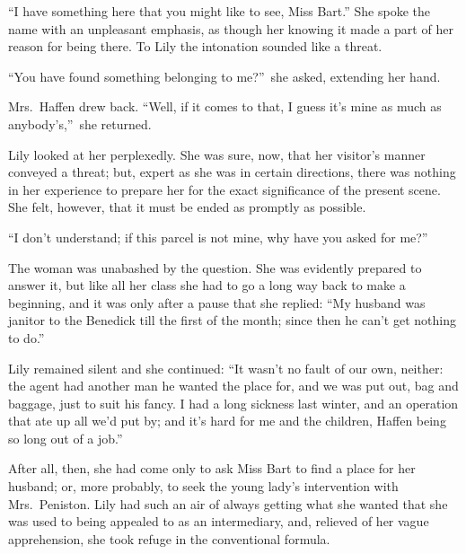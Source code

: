 \documentclass[12pt,a4paper]{book}
\begin{document}
``I have something here that you might like to see, Miss Bart.'' 
She spoke the name with an unpleasant emphasis, as though her
knowing it made a part of her reason for being there. To Lily the
intonation sounded like a threat.





``You have found something belonging to me?''\ she asked, extending
her hand.





Mrs.\ Haffen drew back. ``Well, if it comes to that, I guess it's
mine as much as anybody's,''\ she returned.





Lily looked at her perplexedly. She was sure, now, that her
visitor's manner conveyed a threat; but, expert as she was in
certain directions, there was nothing in her experience to
prepare her for the exact significance of the present scene. She
felt, however, that it must be ended as promptly as possible.





``I don't understand; if this parcel is not mine, why have you
asked for me?''





The woman was unabashed by the question. She was evidently
prepared to answer it, but like all her class she had to go a
long way back to make a beginning, and it was only after a pause
that she replied: ``My husband was janitor to the Benedick till
the first of the month; since then he can't get nothing to do.''





Lily remained silent and she continued: ``It wasn't no fault of
our own, neither: the agent had another man he wanted the place
for, and we was put out, bag and baggage, just to suit his fancy. 
I had a long sickness last winter, and an operation that ate up
all we'd put by; and it's hard for me and the children, Haffen
being so long out of a job.''





After all, then, she had come only to ask Miss Bart to find a
place for her husband; or, more probably, to seek the young
lady's intervention with Mrs.\ Peniston. Lily had such an air
of always getting what she wanted that she was used to being
appealed to as an intermediary, and, relieved of her vague
apprehension, she took refuge in the conventional formula.
\end{document}
